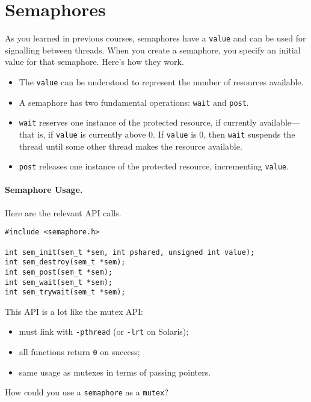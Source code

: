 \section*{Semaphores}
As you learned in previous courses, semaphores have a {\tt value} and
can be used for signalling between threads. When you create a semaphore,
you specify an initial value for that semaphore. Here's how they work.

\begin{itemize}
\item The {\tt value} can be understood to represent the number of resources available.
\item A semaphore has two fundamental operations: {\tt wait} and 
{\tt post}.
\item {\tt wait} reserves one instance of the protected resource, if currently
available---that is, if {\tt value} is currently above 0. If {\tt value} 
is 0, then {\tt wait} suspends the thread until some other thread makes
the resource available.
\item {\tt post} releases one instance of the protected resource,
incrementing {\tt value}.
\end{itemize}

\paragraph{Semaphore Usage.} Here are the relevant API calls.
  \begin{verbatim}
#include <semaphore.h>

int sem_init(sem_t *sem, int pshared, unsigned int value);
int sem_destroy(sem_t *sem);
int sem_post(sem_t *sem);
int sem_wait(sem_t *sem);
int sem_trywait(sem_t *sem);
  \end{verbatim}

This API is a lot like the mutex API:
  \begin{itemize}
    \item must link with {\tt -pthread} (or {\tt -lrt} on Solaris);
    \item all functions return {\tt 0} on success;
    \item same usage as mutexes in terms of passing pointers.
  \end{itemize}

\noindent
How could you use a {\tt semaphore} as a {\tt mutex}?
\vspace*{3em}


